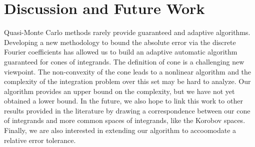 \documentclass[graybox]{svmult}
\begin{document}
%
%

\section{Discussion and Future Work}
Quasi-Monte Carlo methods rarely provide guaranteed and adaptive algorithms. Developing a new methodology to bound the absolute error via the discrete Fourier coefficients has allowed us to build an adaptive automatic algorithm guaranteed for cones of integrands. The definition of cone is a challenging new viewpoint. The non-convexity of the cone leads to a nonlinear algorithm and the complexity of the integration problem over this set may be hard to analyze. Our algorithm provides an upper bound on the complexity, but we have not yet obtained a  lower bound. In the future, we also hope to link this work to other results provided in the literature by drawing a correspondence between our cone of integrands and more common spaces of integrands, like the Korobov spaces. Finally, we are also interested in extending our algorithm to accoomodate  a relative error tolerance.
\end{document}
